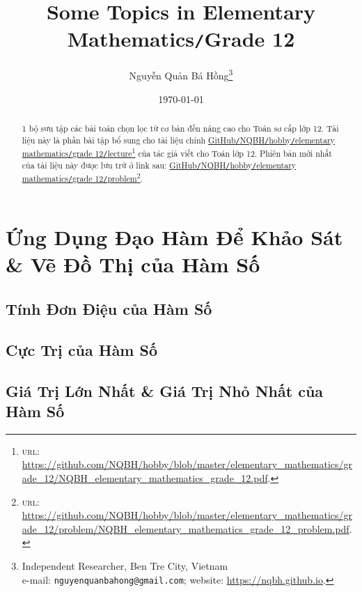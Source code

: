 \documentclass{article}
\title{Some Topics in Elementary Mathematics\texttt{/}Grade 12}
\author{Nguyễn Quản Bá Hồng\footnote{Independent Researcher, Ben Tre City, Vietnam\\e-mail: \texttt{nguyenquanbahong@gmail.com}; website: \url{https://nqbh.github.io}.}}
\date{\today}
\numberwithin{equation}{section}
\begin{document}
\maketitle
\begin{abstract}
	1 bộ sưu tập các bài toán chọn lọc từ cơ bản đến nâng cao cho Toán sơ cấp lớp 12. Tài liệu này là phần bài tập bổ sung cho tài liệu chính \href{https://github.com/NQBH/hobby/blob/master/elementary_mathematics/grade_12/NQBH_elementary_mathematics_grade_12.pdf}{GitHub\texttt{/}NQBH\texttt{/}hobby\texttt{/}elementary mathematics\texttt{/}grade 12\texttt{/}lecture}\footnote{\textsc{url}: \url{https://github.com/NQBH/hobby/blob/master/elementary_mathematics/grade_12/NQBH_elementary_mathematics_grade_12.pdf}.} của tác giả viết cho Toán lớp 12. Phiên bản mới nhất của tài liệu này được lưu trữ ở link sau: \href{https://github.com/NQBH/hobby/blob/master/elementary_mathematics/grade_12/problem/NQBH_elementary_mathematics_grade_12_problem.pdf}{GitHub\texttt{/}NQBH\texttt{/}hobby\texttt{/}elementary mathematics\texttt{/}grade 12\texttt{/}problem}\footnote{\textsc{url}: \url{https://github.com/NQBH/hobby/blob/master/elementary_mathematics/grade_12/problem/NQBH_elementary_mathematics_grade_12_problem.pdf}.}.
\end{abstract}
\tableofcontents
\newpage


\section{Ứng Dụng Đạo Hàm Để Khảo Sát \& Vẽ Đồ Thị của Hàm Số}

\subsection{Tính Đơn Điệu của Hàm Số}


\subsection{Cực Trị của Hàm Số}


\subsection{Giá Trị Lớn Nhất \& Giá Trị Nhỏ Nhất của Hàm Số}
\end{document}
